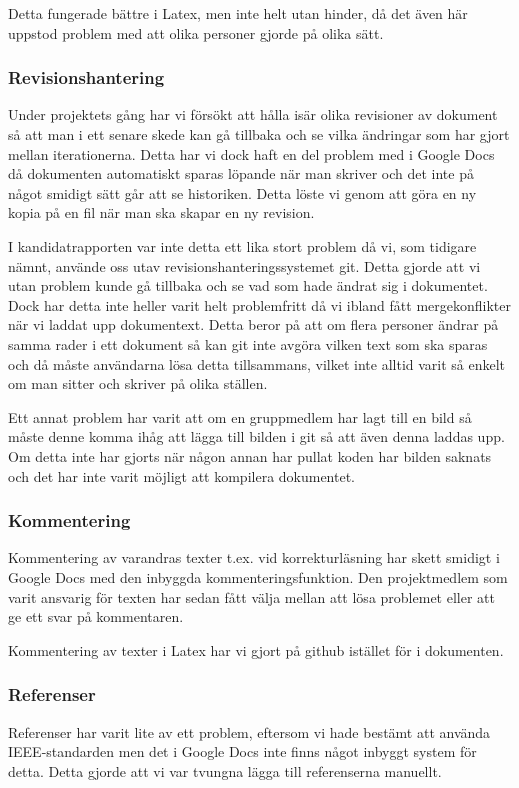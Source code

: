 Detta fungerade bättre i Latex, men inte helt utan hinder, då det även här uppstod problem med att olika personer gjorde på olika sätt.

\subsubsection{Revisionshantering}
Under projektets gång har vi försökt att hålla isär olika revisioner av dokument så att man i ett senare skede kan gå tillbaka och se vilka ändringar som har gjort mellan iterationerna.
Detta har vi dock haft en del problem med i Google Docs då dokumenten automatiskt sparas löpande när man skriver och det inte på något smidigt sätt går att se historiken. Detta löste vi genom att göra en ny kopia på en fil när man ska skapar en ny revision.

I kandidatrapporten var inte detta ett lika stort problem då vi, som tidigare nämnt, använde oss utav revisionshanteringssystemet git. Detta gjorde att vi utan problem kunde gå tillbaka och se vad som hade ändrat sig i dokumentet. Dock har detta inte heller varit helt problemfritt då vi ibland fått mergekonflikter när vi laddat upp dokumentext. Detta beror på att om flera personer ändrar på samma rader i ett dokument så kan git inte avgöra vilken text som ska sparas och då måste användarna lösa detta tillsammans, vilket inte alltid varit så enkelt om man sitter och skriver på olika ställen.

Ett annat problem har varit att om en gruppmedlem har lagt till en bild så måste denne komma ihåg att lägga till bilden i git så att även denna laddas upp. Om detta inte har gjorts när någon annan har pullat koden har bilden saknats och det har inte varit möjligt att kompilera dokumentet.

\subsubsection{Kommentering}
Kommentering av varandras texter t.ex. vid korrekturläsning har skett smidigt i Google Docs med den inbyggda kommenteringsfunktion. Den projektmedlem som varit ansvarig för texten har sedan fått välja mellan att lösa problemet eller att ge ett svar på kommentaren.

Kommentering av texter i Latex har vi gjort på github istället för i dokumenten.

\subsubsection{Referenser}
Referenser har varit lite av ett problem, eftersom vi hade bestämt att använda IEEE-standarden men det i Google Docs inte finns något inbyggt system för detta. Detta gjorde att vi var tvungna lägga till referenserna manuellt.

